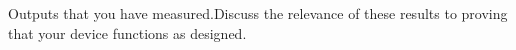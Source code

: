 Outputs that you have measured.Discuss the relevance of these results to proving that your device functions as designed.